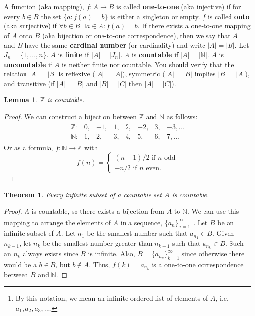 \documentclass[12pt,reqno]{amsart}
\newtheorem{theorem}{Theorem}[section]
\newtheorem{lemma}{Lemma}[section]
\theoremstyle{definition}
\begin{document}
A function (aka mapping), $f:A \rightarrow B$ is called
\textbf{one-to-one} (aka injective) if for every $b \in B$ the set
$\{a: f(a) = b \}$ is either a singleton or empty. $f$ is called
\textbf{onto} (aka surjective) if $\forall b \in B$ $\exists a \in A:
f(a) = b$.  If there exists a one-to-one mapping of $A$ onto $B$ (aka
bijection or one-to-one correspondence), then we say that $A$ and $B$
have the same \textbf{cardinal number} (or cardinality) and write $|A|
= |B|$.  Let $J_n = \{1, ..., n \}$. $A$ is \textbf{finite} if $|A| =
|J_n|$.  $A$ is \textbf{countable} if $|A| = |\mathbb{N}|$. $A$ is
\textbf{uncountable} if $A$ is neither finite nor countable.  You
should verify that the relation $|A| = |B|$ is reflexive ($|A| =
|A|$), symmetric ($|A| = |B|$ implies $|B| = |A|$), and transitive (if
$|A| = |B|$ and $|B| = |C|$ then $|A| = |C|$). 

\begin{lemma}
  $\mathbb{Z}$ is countable. 
\end{lemma}
\begin{proof}
  We can construct a bijection between $\mathbb{Z}$ and $\mathbb{N}$
  as follows:
  \begin{align*}
    \begin{matrix}
      \mathbb{Z}: & 0, & -1, & 1, & 2, & -2, & 3, & -3, ... \\
      \mathbb{N}: & 1, & 2, & 3, & 4, & 5, & 6, & 7,  ...
    \end{matrix}
  \end{align*}
  Or as a formula, $f:\mathbb{N} \rightarrow \mathbb{Z}$ with 
  \[ f(n) = \begin{cases} (n-1)/2 \text{ if } n \text{ odd} \\
    -n/2 \text{ if } n \text{ even}. \end{cases} \]  
\end{proof}

\begin{theorem} \label{thm:countsubset}
  Every infinite subset of a countable set $A$ is countable.
\end{theorem}
\begin{proof}
  $A$ is countable, so there exists a bijection from $A$ to
  $\mathbb{N}$. We can use this mapping to arrange the elements of $A$
  in a sequence, $\{a_{n}\}^\infty_{n=1}$\footnote{By this notation,
    we mean an infinite ordered list of elements of $A$, i.e. $a_1,
    a_2, a_3, ...$.}. Let $B$ be an infinite subset of $A$. Let $n_1$
  be the smallest number such that $a_{n_1} \in B$. Given $n_{k-1}$,
  let $n_k$ be the smallest number greater than $n_{k-1}$ such that
  $a_{n_k} \in B$. Such an $n_k$ always exists since $B$ is
  infinite. Also, $B = \{a_{n_k} \}_{k=1}^\infty$ since otherwise
  there would be a $b \in B$, but $b\not\in A$. Thus, $f(k) = a_{n_k}$
  is a one-to-one correspondence between $B$ and $\mathbb{N}$.
\end{proof}
\end{document}
